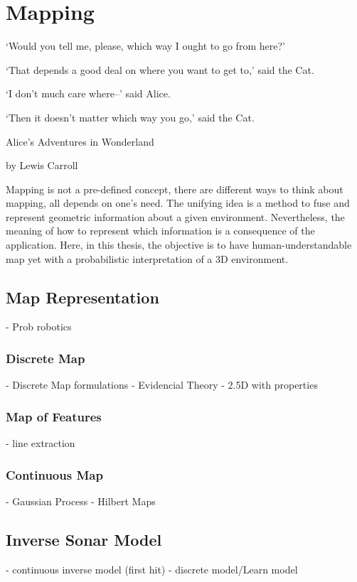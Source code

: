 
\chapter{Mapping}

\renewcommand{\epigraphsize}{\footnotesize}
\epigraph{`Would you tell me, please, which way I ought to go from here?'

  `That depends a good deal on where you want to get to,' said the Cat.

  `I don't much care where--' said Alice.

  `Then it doesn't matter which way you go,' said the Cat. }{Alice's Adventures
  in Wonderland

  by Lewis Carroll}
  
Mapping is not a pre-defined concept, there are different ways to think about
mapping, all depends on one's need. The unifying idea is a method to fuse and
represent geometric information about a given environment. Nevertheless, the
meaning of how to represent which information is a consequence of the
application. Here, in this thesis, the objective is to have human-understandable
map yet with a probabilistic interpretation of a 3D environment. 

\section{Map Representation}
\citet{thrunprob} - Prob robotics
\subsection{Discrete Map}
\citet{Schwendner2013} - Discrete Map formulations
\citet{Pagac1998} - Evidencial Theory
\citet{Coiras2007} - 2.5D with properties
\subsection{Map of Features}
\citet{Ribas2006} - line extraction
\subsection{Continuous Map}
\citet{gan20093d} - Gaussian Process
\citet{ramos2016hilbert} - Hilbert Maps

\section{Inverse Sonar Model}
\citet{Moravec1985} - continuous inverse model (first hit)
\citet{thrunprob} - discrete model/Learn model

